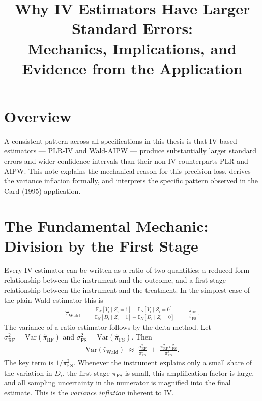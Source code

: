 \documentclass[12pt,a4paper]{article}
\title{\textbf{Why IV Estimators Have Larger Standard Errors:\\
Mechanics, Implications, and Evidence from the Application}}
\author{}
\date{}
\newcommand{\E}{\mathbb{E}}
\begin{document}
\maketitle
\thispagestyle{empty}

\section*{Overview}

A consistent pattern across all specifications in this thesis is that IV-based estimators
--- PLR-IV and Wald-AIPW --- produce substantially larger standard errors and wider
confidence intervals than their non-IV counterparts PLR and AIPW\@.  This note explains
the mechanical reason for this precision loss, derives the variance inflation formally,
and interprets the specific pattern observed in the Card (1995) application.

\section{The Fundamental Mechanic: Division by the First Stage}

Every IV estimator can be written as a ratio of two quantities: a reduced-form
relationship between the instrument and the outcome, and a first-stage relationship
between the instrument and the treatment.  In the simplest case of the plain Wald
estimator this is
\begin{align}
  \hat{\tau}_{\mathrm{Wald}}
  \;=\;
  \frac{
    \E_N[Y_i \mid Z_i=1] - \E_N[Y_i \mid Z_i=0]
  }{
    \E_N[D_i \mid Z_i=1] - \E_N[D_i \mid Z_i=0]
  }
  \;=\;
  \frac{\hat\pi_{\mathrm{RF}}}{\hat\pi_{\mathrm{FS}}}.
  \label{eq:wald_ratio}
\end{align}
The variance of a ratio estimator follows by the delta method.  Let
$\sigma^2_{\mathrm{RF}} = \mathrm{Var}(\hat\pi_{\mathrm{RF}})$ and
$\sigma^2_{\mathrm{FS}} = \mathrm{Var}(\hat\pi_{\mathrm{FS}})$.  Then
\begin{align}
  \mathrm{Var}(\hat\tau_{\mathrm{Wald}})
  \;\approx\;
  \frac{\sigma^2_{\mathrm{RF}}}{\pi_{\mathrm{FS}}^2}
  \;+\;
  \frac{\pi_{\mathrm{RF}}^2 \,\sigma^2_{\mathrm{FS}}}{\pi_{\mathrm{FS}}^4}.
  \label{eq:delta_method}
\end{align}
The key term is $1/\pi_{\mathrm{FS}}^2$.  Whenever the instrument explains only a small
share of the variation in $D_i$, the first stage $\pi_{\mathrm{FS}}$ is small, this
amplification factor is large, and all sampling uncertainty in the numerator is
magnified into the final estimate.  This is the \emph{variance inflation} inherent to
IV\@.
\end{document}
